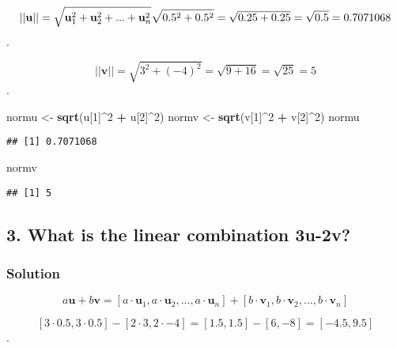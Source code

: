\documentclass[]{article}
\newenvironment{Shaded}{\begin{snugshade}}{\end{snugshade}}
\newcommand{\KeywordTok}[1]{\textcolor[rgb]{0.13,0.29,0.53}{\textbf{#1}}}
\newcommand{\DecValTok}[1]{\textcolor[rgb]{0.00,0.00,0.81}{#1}}
\newcommand{\StringTok}[1]{\textcolor[rgb]{0.31,0.60,0.02}{#1}}
\newcommand{\OperatorTok}[1]{\textcolor[rgb]{0.81,0.36,0.00}{\textbf{#1}}}
\newcommand{\NormalTok}[1]{#1}
\begin{document}
\[ ||\textbf{u}|| = \sqrt{\textbf{u}_1^2 + \textbf{u}_2^2 + ... + \textbf{u}_n^2} \\
\sqrt{0.5^2 + 0.5^2} = \sqrt{0.25 + 0.25} = \sqrt{0.5} = 0.7071068\].

\[ ||\textbf{v}|| = \sqrt{3^2 + (-4)^2} = \sqrt{9 + 16} = \sqrt{25} = 5\].

\begin{Shaded}
\begin{Highlighting}[]
\NormalTok{normu <-}\StringTok{ }\KeywordTok{sqrt}\NormalTok{(u[}\DecValTok{1}\NormalTok{]}\OperatorTok{^}\DecValTok{2} \OperatorTok{+}\StringTok{ }\NormalTok{u[}\DecValTok{2}\NormalTok{]}\OperatorTok{^}\DecValTok{2}\NormalTok{)}
\NormalTok{normv <-}\StringTok{ }\KeywordTok{sqrt}\NormalTok{(v[}\DecValTok{1}\NormalTok{]}\OperatorTok{^}\DecValTok{2} \OperatorTok{+}\StringTok{ }\NormalTok{v[}\DecValTok{2}\NormalTok{]}\OperatorTok{^}\DecValTok{2}\NormalTok{)}
\NormalTok{normu}
\end{Highlighting}
\end{Shaded}

\begin{verbatim}
## [1] 0.7071068
\end{verbatim}

\begin{Shaded}
\begin{Highlighting}[]
\NormalTok{normv}
\end{Highlighting}
\end{Shaded}

\begin{verbatim}
## [1] 5
\end{verbatim}

\subsection{3. What is the linear combination
3u-2v?}\label{what-is-the-linear-combination-3u-2v}

\subsubsection{Solution}\label{solution-2}

\[ a\textbf{u} + b\textbf{v} = [a\cdot\textbf{u}_1, a\cdot\textbf{u}_2, ..., a\cdot\textbf{u}_n] + [b\cdot\textbf{v}_1, b\cdot\textbf{v}_2, ..., b\cdot\textbf{v}_n]\]

\[[3\cdot0.5, 3\cdot0.5] - [2\cdot3, 2\cdot-4] = [1.5, 1.5] - [6, -8] = [-4.5, 9.5]\].
\end{document}
